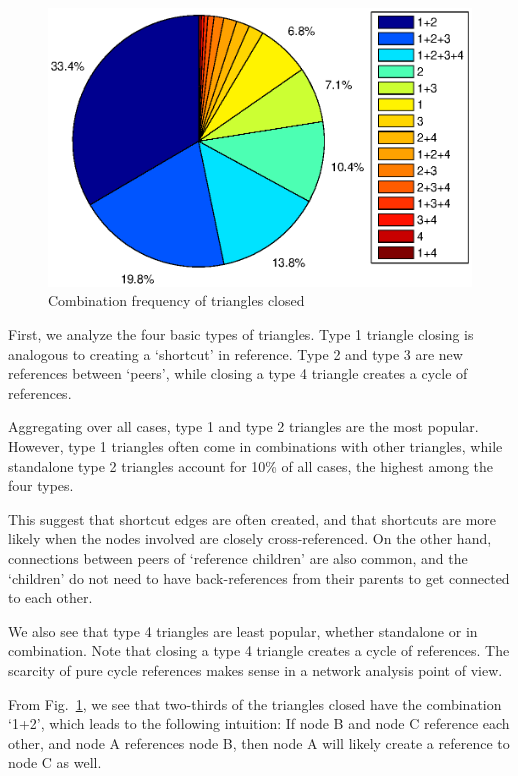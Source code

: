 \documentclass[10pt]{article}
\begin{document}
\begin{multicols}{2}
\begin{figure}[H]
    \includegraphics[scale=0.45, trim = 6cm 1cm 0cm 0cm]{./graphs/15_tri.eps}
    \caption{Combination frequency of triangles closed} \label{fig:combo15}
\end{figure}

First, we analyze the four basic types of triangles. Type 1 triangle closing is analogous to creating a `shortcut' in reference. Type 2 and type 3 are new references between `peers', while closing a type 4 triangle creates a cycle of references. 

Aggregating over all cases, type 1 and type 2 triangles are the most popular. However, type 1 triangles often come in combinations with other triangles, while standalone type 2 triangles account for 10\% of all cases, the highest among the four types.

This suggest that shortcut edges are often created, and that shortcuts are more likely when the nodes involved are closely cross-referenced. On the other hand, connections between peers of `reference children' are also common, and the `children' do not need to have back-references from their parents to get connected to each other.

We also see that type 4 triangles are least popular, whether standalone or in combination. Note that closing a type 4 triangle creates a cycle of references. The scarcity of pure cycle references makes sense in a network analysis point of view.

From Fig.~\ref{fig:combo15}, we see that two-thirds of the triangles closed have the combination `1+2', which leads to the following intuition: If node B and node C reference each other, and node A references node B, then node A will likely create a reference to node C as well.


\end{multicols}
\end{document}
